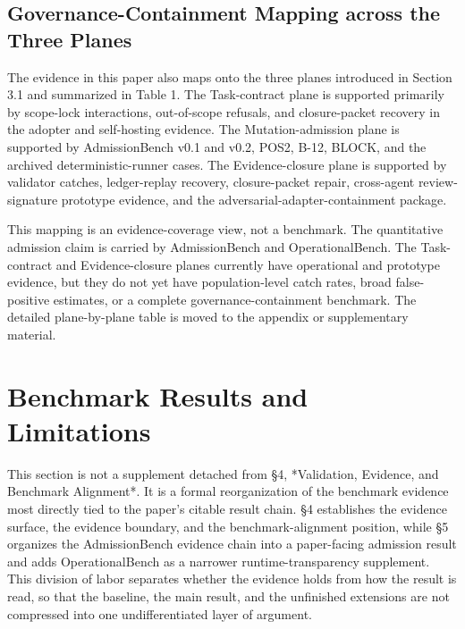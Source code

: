\documentclass[9pt,letterpaper]{extarticle}
\begin{document}
\subsection{Governance-Containment Mapping across the Three Planes}

The evidence in this paper also maps onto the three planes introduced in Section 3.1 and summarized in Table 1. The Task-contract plane is supported primarily by scope-lock interactions, out-of-scope refusals, and closure-packet recovery in the adopter and self-hosting evidence. The Mutation-admission plane is supported by AdmissionBench v0.1 and v0.2, POS2, B-12, BLOCK, and the archived deterministic-runner cases. The Evidence-closure plane is supported by validator catches, ledger-replay recovery, closure-packet repair, cross-agent review-signature prototype evidence, and the adversarial-adapter-containment package.

This mapping is an evidence-coverage view, not a benchmark. The quantitative admission claim is carried by AdmissionBench and OperationalBench. The Task-contract and Evidence-closure planes currently have operational and prototype evidence, but they do not yet have population-level catch rates, broad false-positive estimates, or a complete governance-containment benchmark. The detailed plane-by-plane table is moved to the appendix or supplementary material.

\section{Benchmark Results and Limitations}

This section is not a supplement detached from §4, *Validation, Evidence, and Benchmark Alignment*. It is a formal reorganization of the benchmark evidence most directly tied to the paper's citable result chain. §4 establishes the evidence surface, the evidence boundary, and the benchmark-alignment position, while §5 organizes the AdmissionBench evidence chain into a paper-facing admission result and adds OperationalBench as a narrower runtime-transparency supplement. This division of labor separates {}whether the evidence holds{} from {}how the result is read,{} so that the baseline, the main result, and the unfinished extensions are not compressed into one undifferentiated layer of argument.
\end{document}
